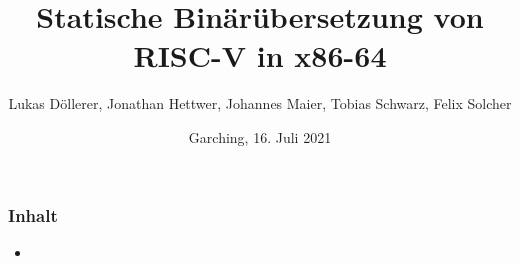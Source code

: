 %
%
%
%





\newcommand{\Datum}{\today}

\renewcommand{\PraesentationFusszeileZusatz}{Rechnerarchitektur-Großpraktikum 2021 | Statische Binärübersetzung von RISC-V in x86-64}

\title{Statische Binärübersetzung von RISC-V in x86-64}
\author{Lukas Döllerer, Jonathan Hettwer, Johannes Maier, Tobias Schwarz, Felix Solcher}
\date[\Datum]{Garching, 16. Juli 2021}
\subject{Statische Binärübersetzung von RISC-V in x86-64}




\PraesentationMasterStandard

\PraesentationTitelseite %




\begin{frame}
    \frametitle{Inhalt}
    \begin{itemize}
        \item
    \end{itemize}
\end{frame}


